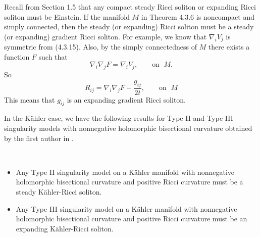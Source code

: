 \begin{remark}
  \label{rem:cz-noncompact-type-ii-models-and-steady-solitons}
Recall from Section 1.5 that any compact steady Ricci soliton or
expanding Ricci soliton must be Einstein. If the manifold $M$ in
Theorem 4.3.6 is noncompact and simply connected, then the steady
(or expanding) Ricci soliton must be a steady (or expanding)
gradient Ricci soliton. For example, we know that $\nabla_iV_j$ is
symmetric from (4.3.15).  Also, by the simply connectedness of $M$
there exists a function $F$ such that
$$
\nabla_i\nabla_jF=\nabla_iV_j,\qquad \text{on }\;M.
$$
So
$$
R_{ij}=\nabla_i\nabla_jF-\frac{g_{ij}}{2t},\qquad \text{on }\;M
$$
This means that $g_{ij}$ is an expanding gradient Ricci soliton.
\end{remark}

In the K\"ahler case, we have the following results for Type II
and Type III singularity models with nonnegative holomorphic
bisectional curvature obtained by the first author in
\cite{Cao97}.

\begin{theorem}
  \label{thm:cz-kahler-type-ii-models-are-steady-solitons}
 \
\begin{itemize}
\item[(i)] Any Type {\rm II} singularity model on a K\"ahler
manifold with nonnegative holomorphic bisectional curvature and
positive Ricci curvature must be a steady K\"ahler-Ricci soliton.
\item[(ii)] Any Type {\rm III} singularity model on a K\"ahler
manifold with nonnegative holomorphic bisectional curvature and
positive Ricci curvature must be an expanding K\"ahler-Ricci
soliton.
\end{itemize}
\end{theorem}

